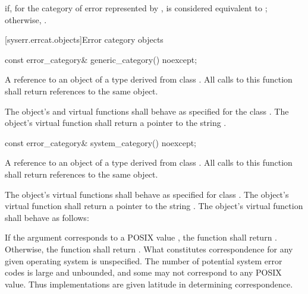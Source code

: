 \begin{itemdescr}
\pnum
\returns {} if, for the category of error represented by ,  is considered equivalent to ; otherwise, .
\end{itemdescr}

[syserr.errcat.objects]{Error category objects}

\begin{itemdecl}
const error_category& generic_category() noexcept;
\end{itemdecl}

\begin{itemdescr}
\pnum
\returns A reference to an object of a type derived from class .
All calls to this function shall return references to the same object.

\pnum
\notes The object's  and  virtual functions shall behave as specified for the class . The object's  virtual function shall return a pointer to the string .
\end{itemdescr}

\begin{itemdecl}
const error_category& system_category() noexcept;
\end{itemdecl}

\begin{itemdescr}
\pnum
\returns A reference to an object of a type derived from class .
All calls to this function shall return references to the same object.

\pnum
\notes The object's  virtual functions shall behave as specified for
class . The object's  virtual function shall return a
pointer to the string . The object's 
virtual function shall behave as follows:

If the argument  corresponds to a POSIX  value , the
function shall return .
Otherwise, the function shall return . What constitutes correspondence for any given operating
system is unspecified. \enternote The number of potential system error codes is large
and unbounded, and some may not correspond to any POSIX  value. Thus
implementations are given latitude in determining correspondence. \exitnote
\end{itemdescr}

